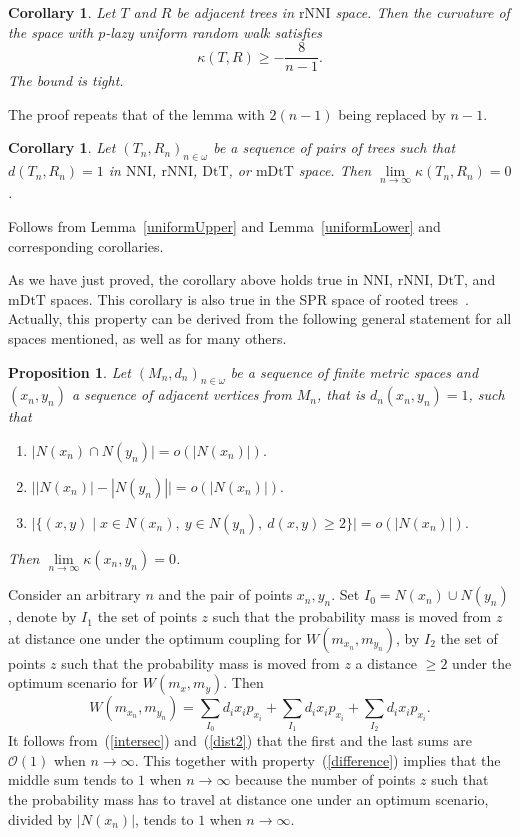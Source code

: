 \documentclass{amsart}
\newtheorem{proposition}[lemma]{Proposition}
\newtheorem{corollary}[lemma]{Corollary}
\newcommand{\dts}{\mathrm{DtT}}
\newcommand{\nni}{\mathrm{NNI}}
\newcommand{\rnni}{\mathrm{rNNI}}
\newcommand{\mdts}{\mathrm{mDtT}}
\renewcommand{\O}{\mathcal{O}}
\begin{document}
\begin{corollary}
Let $T$ and $R$ be adjacent trees in $\rnni$ space.
Then the curvature of the space with $p$-lazy uniform random walk satisfies
\[
\kappa(T,R) \geq -\frac{8}{n-1}.
\]
The bound is tight.
\end{corollary}

\proof
The proof repeats that of the lemma with $2(n-1)$ being replaced by $n-1$.
\endproof

\begin{corollary}\label{flatInLimDTS}
Let $(T_n,R_n)_{n\in\omega}$ be a sequence of pairs of trees such that
$d(T_n,R_n) = 1$ in $\nni$, $\rnni$, $\dts$, or $\mdts$ space.
Then $\lim\limits_{n \to \infty}\kappa(T_n,R_n) = 0$.
\end{corollary}

\proof
Follows from Lemma~\ref{uniformUpper} and Lemma~\ref{uniformLower} and corresponding corollaries.
\endproof

As we have just proved, the corollary above holds true in $\nni$, $\rnni$, $\dts$, and $\mdts$ spaces.
This corollary is also true in the SPR space of rooted trees~\cite{Whidden2015-es}.
Actually, this property can be derived from the following general statement for all spaces mentioned, as well as for many others.

\begin{proposition}\label{flatInLimGen}
Let $(M_n,d_n)_{n \in \omega}$ be a sequence of finite metric spaces and
$(x_n, y_n)$ a sequence of adjacent vertices from $M_n$,
that is $d_n(x_n,y_n) = 1$, such that
\begin{enumerate}[(1)]
\item\label{intersec} $\big|N(x_n) \cap N(y_n)\big| = o(|N(x_n)|).$
\item\label{difference} $\big||N(x_n)| - |N(y_n)|\big| = o(|N(x_n)|).$
\item\label{dist2} $\big|\{(x,y) \mid
	x \in N(x_n),~ y \in N(y_n),~ d(x, y) \geq 2\}\big| = o(|N(x_n)|).$
\end{enumerate}

Then $\lim\limits_{n \to \infty} \kappa(x_n, y_n) = 0$.
\end{proposition}

\proof
Consider an arbitrary $n$ and the pair of points $x_n,y_n$.
Set $I_0 = N(x_n) \cup N(y_n)$, denote by $I_1$ the set of points
$z$ such that the probability mass is moved from $z$ at distance one under the
optimum coupling for $W(m_{x_n},m_{y_n})$, by $I_2$ the set of points $z$ such that
the probability mass is moved from $z$ a distance $\geq 2$ under the optimum
scenario for $W(m_x,m_y)$. Then
\[
W(m_{x_n},m_{y_n}) = \sum_{I_0} d_i x_i p_{x_i} + \sum_{I_1} d_i x_i p_{x_i} +
\sum_{I_2} d_i x_i p_{x_i}.
\]
It follows from~(\ref{intersec}) and~(\ref{dist2}) that the first and the last sums
are $\O(1)$ when $n\to\infty$. This together with property~(\ref{difference})
implies that the middle sum tends to $1$ when $n\to\infty$ because the number of
points $z$ such that the probability mass has to travel at distance one under an
optimum scenario, divided by $|N(x_n)|$, tends to $1$ when $n\to\infty$.
\endproof
\end{document}
